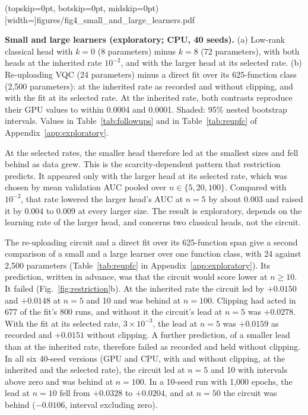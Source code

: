 \documentclass{ieeeaccess}
\newcommand{\vqc}{VQC}
\newcommand{\widecap}[1]{\parbox[t]{0.87\textwidth}{#1}}
\begin{document}
\Figure[t!](topskip=0pt, botskip=0pt, midskip=0pt)[width=\textwidth]{figures/fig4_small_and_large_learners.pdf}
{\widecap{\textbf{Small and large learners (exploratory; CPU, 40 seeds).} (a) Low-rank classical head with $k=0$ (8 parameters) minus $k=8$ (72 parameters), with both heads at the inherited rate $10^{-2}$, and with the larger head at its selected rate. (b) Re-uploading \vqc{} (24 parameters) minus a direct fit over its 625-function class (2,500 parameters): at the inherited rate as recorded and without clipping, and with the fit at its selected rate. At the inherited rate, both contrasts reproduce their GPU values to within 0.0004 and 0.0001. Shaded: 95\% nested bootstrap intervals. Values in Table~\ref{tab:followups} and in Table~\ref{tab:reupfc} of Appendix~\ref{app:exploratory}.}\label{fig:restriction}}

At the selected rates, the smaller head therefore led at the smallest sizes and fell behind as data grew. This is the scarcity-dependent pattern that restriction predicts. It appeared only with the larger head at its selected rate, which was chosen by mean validation AUC pooled over $n\in\{5,20,100\}$. Compared with $10^{-2}$, that rate lowered the larger head's AUC at $n=5$ by about 0.003 and raised it by 0.004 to 0.009 at every larger size. The result is exploratory, depends on the learning rate of the larger head, and concerns two classical heads, not the circuit.

The re-uploading circuit and a direct fit over its 625-function span give a second comparison of a small and a large learner over one function class, with 24 against 2,500 parameters (Table~\ref{tab:reupfc} in Appendix~\ref{app:exploratory}). Its prediction, written in advance, was that the circuit would score lower at $n\ge10$. It failed (Fig.~\ref{fig:restriction}b). At the inherited rate the circuit led by $+0.0150$ and $+0.0148$ at $n=5$ and 10 and was behind at $n=100$. Clipping had acted in 677 of the fit's 800 runs, and without it the circuit's lead at $n=5$ was $+0.0278$. With the fit at its selected rate, $3\times10^{-3}$, the lead at $n=5$ was $+0.0159$ as recorded and $+0.0151$ without clipping. A further prediction, of a smaller lead than at the inherited rate, therefore failed as recorded and held without clipping. In all six 40-seed versions (GPU and CPU, with and without clipping, at the inherited and the selected rate), the circuit led at $n=5$ and 10 with intervals above zero and was behind at $n=100$. In a 10-seed run with 1,000 epochs, the lead at $n=10$ fell from $+0.0328$ to $+0.0204$, and at $n=50$ the circuit was behind ($-0.0106$, interval excluding zero).
\end{document}
